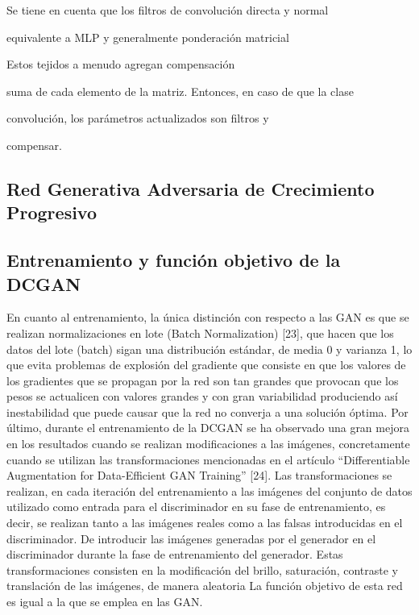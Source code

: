 Se tiene en cuenta que los filtros de convolución directa y normal

equivalente a MLP y generalmente ponderación matricial

Estos tejidos a menudo agregan compensación

suma de cada elemento de la matriz.
Entonces, en caso de que la clase

convolución, los parámetros actualizados son filtros y

compensar.


\subsection{ Red Generativa Adversaria de Crecimiento Progresivo}\label{Red generativa adversaria de crecimiento progresivo}

\subsection{Entrenamiento y función objetivo de la DCGAN}\label{sec. entrenamiento y funcion objetivo de la DCGAN}
En cuanto al entrenamiento, la única distinción con respecto a las GAN es que
se realizan normalizaciones en lote (Batch Normalization) [23], que hacen que
los datos del lote (batch) sigan una distribución estándar, de media 0 y varianza
1, lo que evita problemas de explosión del gradiente que consiste en que los
valores de los gradientes que se propagan por la red son tan grandes que
provocan que los pesos se actualicen con valores grandes y con gran variabilidad
produciendo así inestabilidad que puede causar que la red no converja a una
solución óptima.
Por último, durante el entrenamiento de la DCGAN se ha observado una gran
mejora en los resultados cuando se realizan modificaciones a las imágenes,
concretamente cuando se utilizan las transformaciones mencionadas en el
artículo “Differentiable Augmentation for Data-Efficient GAN Training” [24]. Las
transformaciones se realizan, en cada iteración del entrenamiento a las
imágenes del conjunto de datos utilizado como entrada para el discriminador
en su fase de entrenamiento, es decir, se realizan tanto a las imágenes reales
como a las falsas introducidas en el discriminador.
De introducir las imágenes generadas por el generador en el discriminador
durante la fase de entrenamiento del generador. Estas transformaciones
consisten en la modificación del brillo, saturación, contraste y translación de
las imágenes, de manera aleatoria
La función objetivo de esta red es igual a la que se emplea en las GAN.
